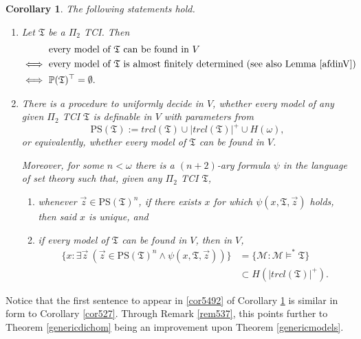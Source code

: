 \documentclass[12pt, twoside]{memoir}
\numberwithin{equation}{section}
\newtheorem{cor}[thm]{Corollary}
\theoremstyle{definition}
\theoremstyle{remark}
\theoremstyle{definition}
\theoremstyle{definition}
\theoremstyle{definition}
\theoremstyle{remark}
\begin{document}
\begin{cor}\label{cor549}
The following statements hold.
\begin{enumerate}[label=(\arabic*)]
    \item\label{cor5491} Let $\mathfrak{T}$ be a $\Pi_2$ TCI. Then
    \begin{align*}
        & \text{every model of } \mathfrak{T} \text{ can be found in } V \\
        \iff \ & \text{every model of } \mathfrak{T} \text{ is almost finitely determined (see also Lemma \ref{afdinV})} \\
        \iff \ & \mathbb{P}(\mathfrak{T})^{\top} = \emptyset \text{.}
    \end{align*}
    \item\label{cor5492} There is a procedure to uniformly decide in $V$, whether every model of any given $\Pi_2$ TCI $\mathfrak{T}$ is definable in $V$ with parameters from $$\mathrm{PS}(\mathfrak{T}) := trcl(\mathfrak{T}) \cup |trcl(\mathfrak{T})|^+ \cup H(\omega) \text{,}$$ or equivalently, whether every model of $\mathfrak{T}$ can be found in $V$.
    
    Moreover, for some $n < \omega$ there is a $(n+2)$-ary formula $\psi$ in the language of set theory such that, given any $\Pi_2$ TCI $\mathfrak{T}$,
    \begin{enumerate}[label=(\alph*)]
        \item whenever $\Vec{z} \in \mathrm{PS}(\mathfrak{T})^n$, if there exists $x$ for which $\psi(x, \mathfrak{T}, \Vec{z})$ holds, then said $x$ is unique, and
        \item if every model of $\mathfrak{T}$ can be found in $V$, then in $V$, 
        \begin{align*}
            \{x : \exists \Vec{z} \ (\Vec{z} \in \mathrm{PS}(\mathfrak{T})^n \wedge \psi(x, \mathfrak{T}, \Vec{z}))\} & = \{\mathcal{M} : \mathcal{M} \models^* \mathfrak{T}\} \\
            & \subset H(|trcl(\mathfrak{T})|^+) \text{.}
        \end{align*}
    \end{enumerate}
\end{enumerate}
\end{cor}
Notice that the first sentence to appear in \ref{cor5492} of Corollary \ref{cor549} is similar in form to Corollary \ref{cor527}. Through Remark \ref{rem537}, this points further to Theorem \ref{genericdichom} being an improvement upon Theorem \ref{genericmodels}. 
\end{document}
